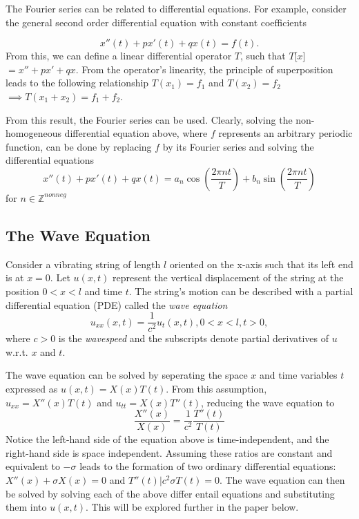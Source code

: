 \documentclass{article}
\begin{document}
The Fourier series can be related to differential equations. For example, consider the general second order differential equation with constant coefficients

\begin{equation*}
	x''(t) + px'(t)+qx(t)=f(t).
\end{equation*}
From this, we can define a linear differential operator $T$, such that $T$[$x$] $=x''+px'+qx$. From the operator's linearity, the principle of superposition leads to the following relationship
$T(x_{1}) = f_{1}$ and   $T(x_{2})=f_{2}$  $\implies T(x_1+x_2)=f_1+f_2$.

From this result, the Fourier series can be used. Clearly, solving the non-homogeneous differential equation above, where $f$ represents an arbitrary periodic function, can be done by replacing $f$ by its Fourier series and solving the differential equations
\begin{equation*}
	x''(t)+px'(t)+qx(t)=a_{n}\cos(\frac{2\pi nt}{T})+b_{n}\sin(\frac{2\pi nt}{T})
\end{equation*}for $n \in \mathbb{Z}^{nonneg}$

\subsection{The Wave Equation}
Consider a vibrating string of length $l$ oriented on the x-axis such that its left end is at $x=0$. Let $u(x,t)$ represent the vertical displacement of the string at the position   $ 0 < x < l$ and time $t$. The string's motion can be described with a partial differential equation (PDE) called the \textit{wave equation}  
\begin{equation*}
	u_{xx}(x,t)=\frac{1}{c^2}u_t(x,t), 0 < x < l, t > 0,
\end{equation*}
where $c>0$ is the \textit{wavespeed} and the subscripts denote partial derivatives of $u$ w.r.t. $x$ and $t$. 

The wave equation can be solved by seperating the space $x$ and time variables $t$ expressed as $u(x,t)=X(x)T(t)$. From this assumption, $u_{xx}= X''(x)T(t)$ and $u_{tt}=X(x)T''(t)$, reducing the wave equation to
\begin{equation*}
	\frac{X''(x)}{X(x)}=\frac{1}{c^2}\frac{T''(t)}{T(t)}
\end{equation*}Notice the left-hand side of the equation above is time-independent, and the right-hand side is space independent. Assuming these ratios are constant and equivalent to $-\sigma$ leads to the formation of two ordinary differential equations:
$X''(x)+\sigma X(x)=0$					and 					$T''(t)|c^2 \sigma T(t)=0$.
The wave equation can then be solved by solving each of the above differ entail equations and substituting them into $u(x,t)$. This will be explored further in the paper below.
\end{document}
